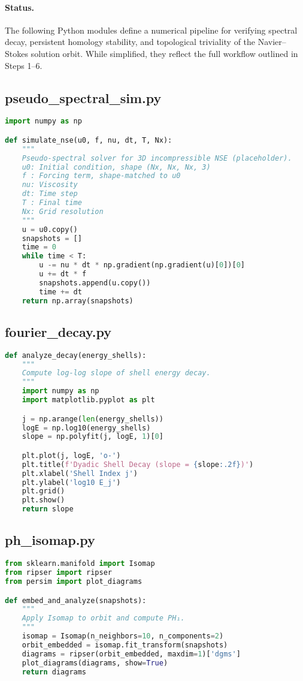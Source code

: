 \documentclass[11pt]{article}
\theoremstyle{definition}
\begin{document}
\paragraph{Status.}
The following Python modules define a numerical pipeline for verifying spectral decay, persistent homology stability, and topological triviality of the Navier--Stokes solution orbit. While simplified, they reflect the full workflow outlined in Steps 1–6.

\subsection*{pseudo\_spectral\_sim.py}
\begin{lstlisting}[language=Python]
import numpy as np

def simulate_nse(u0, f, nu, dt, T, Nx):
    """
    Pseudo-spectral solver for 3D incompressible NSE (placeholder).
    u0: Initial condition, shape (Nx, Nx, Nx, 3)
    f : Forcing term, shape-matched to u0
    nu: Viscosity
    dt: Time step
    T : Final time
    Nx: Grid resolution
    """
    u = u0.copy()
    snapshots = []
    time = 0
    while time < T:
        u -= nu * dt * np.gradient(np.gradient(u)[0])[0]
        u += dt * f
        snapshots.append(u.copy())
        time += dt
    return np.array(snapshots)
\end{lstlisting}

\subsection*{fourier\_decay.py}
\begin{lstlisting}[language=Python]
def analyze_decay(energy_shells):
    """
    Compute log-log slope of shell energy decay.
    """
    import numpy as np
    import matplotlib.pyplot as plt

    j = np.arange(len(energy_shells))
    logE = np.log10(energy_shells)
    slope = np.polyfit(j, logE, 1)[0]

    plt.plot(j, logE, 'o-')
    plt.title(f'Dyadic Shell Decay (slope = {slope:.2f})')
    plt.xlabel('Shell Index j')
    plt.ylabel('log10 E_j')
    plt.grid()
    plt.show()
    return slope
\end{lstlisting}

\subsection*{ph\_isomap.py}
\begin{lstlisting}[language=Python]
from sklearn.manifold import Isomap
from ripser import ripser
from persim import plot_diagrams

def embed_and_analyze(snapshots):
    """
    Apply Isomap to orbit and compute PH₁.
    """
    isomap = Isomap(n_neighbors=10, n_components=2)
    orbit_embedded = isomap.fit_transform(snapshots)
    diagrams = ripser(orbit_embedded, maxdim=1)['dgms']
    plot_diagrams(diagrams, show=True)
    return diagrams
\end{lstlisting}
\end{document}
